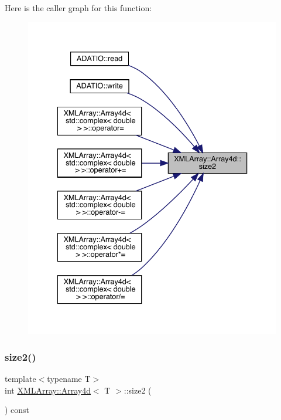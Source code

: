 Here is the caller graph for this function\+:
\nopagebreak
\begin{figure}[H]
\begin{center}
\leavevmode
\includegraphics[width=336pt]{de/d16/classXMLArray_1_1Array4d_a18c3f8237c652b642c5de6df15764c34_icgraph}
\end{center}
\end{figure}
\mbox{\label{classXMLArray_1_1Array4d_a18c3f8237c652b642c5de6df15764c34}} 
\subsubsection{\texorpdfstring{size2()}{size2()}\hspace{0.1cm}{\footnotesize\ttfamily [3/3]}}
{\footnotesize\ttfamily template$<$typename T$>$ \\
int \mbox{\hyperlink{classXMLArray_1_1Array4d}{X\+M\+L\+Array\+::\+Array4d}}$<$ T $>$\+::size2 (\begin{DoxyParamCaption}{ }\end{DoxyParamCaption}) const\hspace{0.3cm}{\ttfamily [inline]}}

